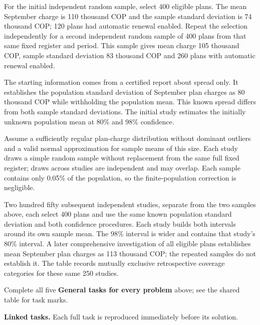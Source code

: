 For the initial independent random sample, select 400 eligible plans. The mean September charge is 110 thousand COP and the sample standard deviation is 74 thousand COP; 120 plans had automatic renewal enabled. Repeat the selection independently for a second independent random sample of 400 plans from that same fixed register and period. This sample gives mean charge 105 thousand COP, sample standard deviation 83 thousand COP and 260 plans with automatic renewal enabled.

The starting information comes from a certified report about spread only. It establishes the population standard deviation of September plan charges as 80 thousand COP while withholding the population mean. This known spread differs from both sample standard deviations. The initial study estimates the initially unknown population mean at 80\% and 98\% confidence.

Assume a sufficiently regular plan-charge distribution without dominant outliers and a valid normal approximation for sample means of this size. Each study draws a simple random sample without replacement from the same full fixed register; draws across studies are independent and may overlap. Each sample contains only 0.05\% of the population, so the finite-population correction is negligible.

Two hundred fifty subsequent independent studies, separate from the two samples above, each select 400 plans and use the same known population standard deviation and both confidence procedures. Each study builds both intervals around its own sample mean. The 98\% interval is wider and contains that study's 80\% interval. A later comprehensive investigation of all eligible plans establishes mean September plan charges as 113 thousand COP; the repeated samples do not establish it. The table records mutually exclusive retrospective coverage categories for these same 250 studies.


Complete all five \textbf{General tasks for every problem} above; see the shared table for task marks.

\textbf{Linked tasks.} Each full task is reproduced immediately before its solution.

